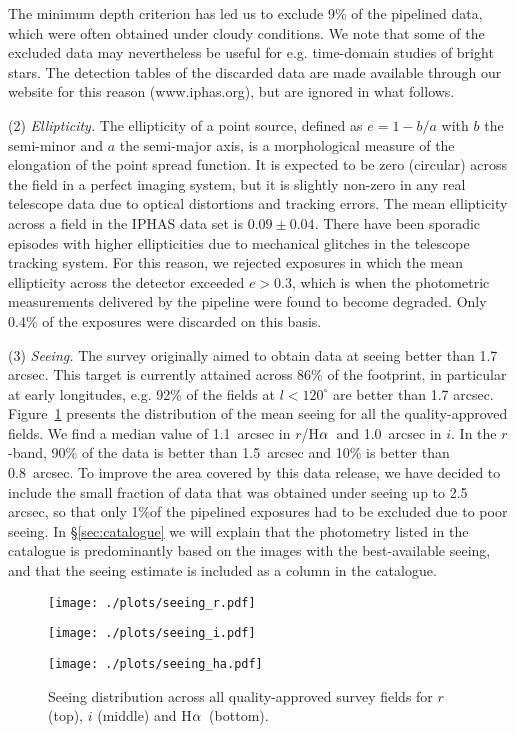 \documentclass[useAMS,usenatbib]{mn2e}
\def\ha{\mbox{H$\rm \alpha$}}
\begin{document}
The minimum depth criterion
has led us to exclude 9\% of the pipelined data,
which were often obtained under cloudy conditions.
We note that some of the excluded data may nevertheless be useful
for e.g. time-domain studies of bright stars.
The detection tables of the discarded data are made
available through our website for this reason (www.iphas.org),
but are ignored in what follows.

(2) \emph{Ellipticity.} 
The ellipticity of a point source,
defined as $e = 1 - b / a$ 
with $b$ the semi-minor and $a$ the semi-major axis,
is a morphological measure of the elongation of the point spread function.
It is expected to be zero (circular) across the field 
in a perfect imaging system,
but it is slightly non-zero in any real telescope data 
due to optical distortions and tracking errors.
The mean ellipticity across a field in the IPHAS data set 
is $0.09\pm0.04$.
There have been sporadic episodes with higher ellipticities
due to mechanical glitches in the telescope tracking system.
For this reason, we rejected exposures in which the mean ellipticity
across the detector exceeded $e > 0.3$,
which is when the photometric measurements delivered by the pipeline
were found to become degraded.
Only 0.4\% of the exposures were discarded on this basis.

(3) \emph{Seeing.} 
The survey originally aimed to obtain data 
at seeing better than 1.7 arcsec.
This target is currently attained across 86\% of the footprint,
in particular at early longitudes,
e.g. 92\% of the fields at $l<120^\circ$ are better than 1.7 arcsec.
Figure~\ref{fig:seeing} presents the distribution
of the mean seeing for all the quality-approved fields.
We find a median value of 1.1~arcsec in $r$/\ha\
and 1.0~arcsec in $i$.
In the $r$-band, 90\% of the data is better than 1.5~arcsec
and 10\% is better than 0.8~arcsec.
To improve the area covered by this data release,
we have decided to include the small fraction of data
that was obtained under seeing up to 2.5 arcsec,
so that only 1\%of the pipelined exposures
had to be excluded due to poor seeing.
In \S\ref{sec:catalogue} we will explain
that the photometry listed in the catalogue
is predominantly based on the images with the
best-available seeing, and that the seeing estimate
is included as a column in the catalogue.

\begin{figure}
    \begin{minipage}[b]{\linewidth}
        \texttt{[image: ./plots/seeing\_r.pdf]} 
    \end{minipage}
    \begin{minipage}[b]{\linewidth}
        \texttt{[image: ./plots/seeing\_i.pdf]} 
    \end{minipage}
    \begin{minipage}[b]{\linewidth}
        \texttt{[image: ./plots/seeing\_ha.pdf]} 
    \end{minipage}
    \caption{Seeing distribution across all
             quality-approved survey fields
             for $r$ (top), $i$ (middle) and \ha\ (bottom).}
    \label{fig:seeing}
\end{figure}
\end{document}
